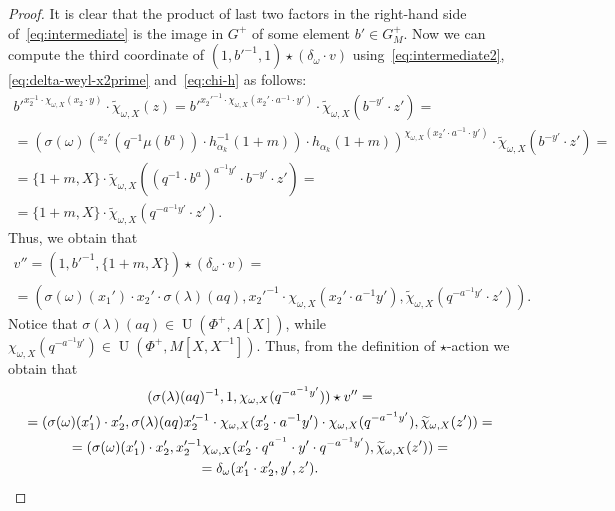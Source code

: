 \documentclass[oneside, 10pt]{amsart}
\DeclareMathOperator{\UU}{U}
\newcommand{\inv}{^{-1}}
\numberwithin{equation}{section}
\numberwithin{thm}{section}
\numberwithin{lemma}{section}
\theoremstyle{definition}
\theoremstyle{remark}
\begin{document}
\begin{proof}
It is clear that the product of last two factors in the right-hand side of~\eqref{eq:intermediate} is
the image in $G^+$ of some element $b' \in G_M^+$.
Now we can compute the third coordinate of $(1, {b'}^{-1}, 1) \star (\delta_\omega \cdot v)$ using~\eqref{eq:intermediate2}, \eqref{eq:delta-weyl-x2prime} and~\eqref{eq:chi-h} as follows:
\begin{multline*}
{b'}^{x_2^{-1} \cdot \chi_{\omega, X}(x_2 \cdot y) } \cdot \widetilde{\chi}_{\omega, X}(z) =
{b'}^{{x_2'}^{-1} \cdot \chi_{\omega, X}(x_2' \cdot a^{-1} \cdot y') } \cdot \widetilde{\chi}_{\omega, X}(b^{-y'} \cdot z') = \\
= \left(\sigma(\omega)\left( {}^{x_2'}(q^{-1} \mu(b^a)) \cdot h^{-1}_{\alpha_k}(1+m)\right) \cdot h_{\alpha_k}(1+m)\right)^{\chi_{\omega, X}(x_2' \cdot a^{-1} \cdot y')} \cdot \widetilde{\chi}_{\omega, X}(b^{-y'} \cdot z') = \\
= \{1+m, X\} \cdot \widetilde{\chi}_{\omega, X}\left( \left( q^{-1} \cdot b^a \right)^{a^{-1}y'} \cdot b^{-y'} \cdot z' \right) = \\
= \{1+m, X\} \cdot \widetilde{\chi}_{\omega, X}(q^{-a^{-1}y'} \cdot z').
\end{multline*}
Thus, we obtain that
\begin{multline*}
v'' = (1, {b'}^{-1}, \{1 + m, X\}) \star (\delta_\omega \cdot v) = \\ =
(\sigma(\omega)(x_1') \cdot x_2' \cdot \sigma(\lambda)(aq), x_2'^{-1} \cdot \chi_{\omega, X}(x_2' \cdot a^{-1} y'), \widetilde{\chi}_{\omega, X}(q^{-a^{-1}y'} \cdot z')).
\end{multline*}
Notice that $\sigma(\lambda)(aq) \in \UU(\Phi^+, A[X])$, while $\chi_{\omega, X}(q^{-a^{-1}y'})\in \UU(\Phi^+, M[X, X\inv])$.
Thus, from the definition of $\star$-action we obtain that
\begin{multline*}
(\sigma(\lambda)(aq)^{-1}, 1, \chi_{\omega, X}(q^{-a^{-1}y'})) \star v'' = \\
= (\sigma(\omega)(x_1') \cdot x_2', \sigma(\lambda)(aq) x_2'^{-1} \cdot \chi_{\omega, X}(x_2' \cdot a^{-1} y') \cdot \chi_{\omega, X}(q^{-a^{-1}y'}), \widetilde{\chi}_{\omega, X}(z')) = \\
= (\sigma(\omega)(x_1') \cdot x_2', x_2'^{-1} \chi_{\omega, X}(x_2' \cdot q^{a^{-1}} \cdot y' \cdot q^{-a^{-1}y'}), \widetilde{\chi}_{\omega, X}(z')) = \\
= \delta_\omega (x_1' \cdot x_2', y', z'). \qedhere
\end{multline*}
\end{proof}
\end{document}
